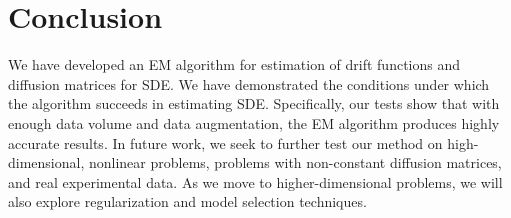 \documentclass{article}
\begin{document}
\vspace{-1.5ex}
\section{Conclusion}
\vspace{-1.5ex}

We have developed an EM algorithm for estimation of drift functions and diffusion matrices for SDE.  We have demonstrated the conditions under which the algorithm succeeds in estimating SDE.  Specifically, our tests show that with enough data volume and data augmentation, the EM algorithm produces highly accurate results.  In future work, we seek to further test our method on high-dimensional, nonlinear problems, problems with non-constant diffusion matrices, and real experimental data.  As we move to higher-dimensional problems, we will also explore regularization and model selection techniques.

\clearpage

{\small


}
\end{document}
